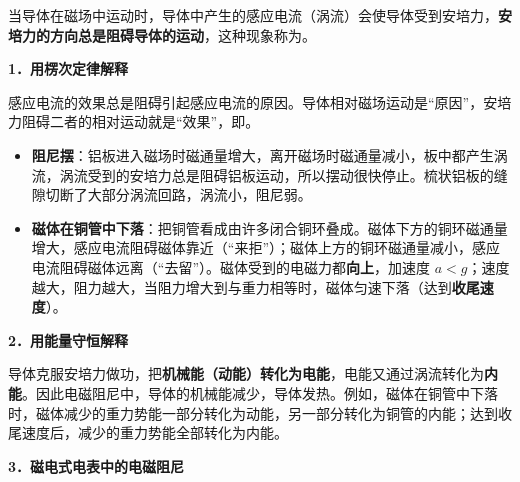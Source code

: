 \begin{zhishi}[电磁阻尼]
当导体在磁场中运动时，导体中产生的感应电流（涡流）会使导体受到安培力，\textbf{安培力的方向总是阻碍导体的运动}，这种现象称为。
\end{zhishi}

\noindent\textbf{1．用楞次定律解释}

感应电流的效果总是阻碍引起感应电流的原因。导体相对磁场运动是“原因”，安培力阻碍二者的相对运动就是“效果”，即。
\begin{itemize}[leftmargin=2.4em,label=\textbullet]
  \item \textbf{阻尼摆}：铝板进入磁场时磁通量增大，离开磁场时磁通量减小，板中都产生涡流，涡流受到的安培力总是阻碍铝板运动，所以摆动很快停止。梳状铝板的缝隙切断了大部分涡流回路，涡流小，阻尼弱。
  \item \textbf{磁体在铜管中下落}：把铜管看成由许多闭合铜环叠成。磁体下方的铜环磁通量增大，感应电流阻碍磁体靠近（“来拒”）；磁体上方的铜环磁通量减小，感应电流阻碍磁体远离（“去留”）。磁体受到的电磁力都\textbf{向上}，加速度 $a<g$；速度越大，阻力越大，当阻力增大到与重力相等时，磁体匀速下落（达到\textbf{收尾速度}）。
\end{itemize}

\noindent\textbf{2．用能量守恒解释}

导体克服安培力做功，把\textbf{机械能（动能）转化为电能}，电能又通过涡流转化为\textbf{内能}。因此电磁阻尼中，导体的机械能减少，导体发热。例如，磁体在铜管中下落时，磁体减少的重力势能一部分转化为动能，另一部分转化为铜管的内能；达到收尾速度后，减少的重力势能全部转化为内能。

\noindent\textbf{3．磁电式电表中的电磁阻尼}


